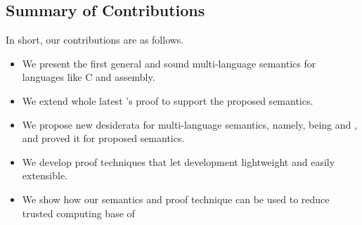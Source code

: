 {%









\subsection{Summary of Contributions}\label{sec:introduction:summary}

In short, our contributions are as follows.
\begin{itemize}
  \item We present the first general and sound multi-language semantics for languages like C and assembly.
  \item We extend whole latest \cc{}'s proof to support the proposed semantics.
  \item We propose new desiderata for multi-language semantics, namely, being \lbound{} and \ubound{}, and proved it for proposed semantics.
  \item We develop proof techniques that let development lightweight and easily extensible.
  \item We show how our semantics and proof technique can be used to reduce trusted computing base of \cc{}
\end{itemize}

}
